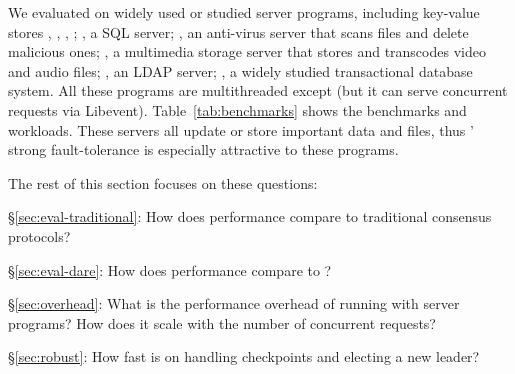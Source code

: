We evaluated \xxx on \nprog widely used or studied server programs, including
\nkvprog key-value stores \redis, \memcached, \ssdb, \mongodb; \mysql, a SQL
server; \clamav, an anti-virus server that scans files and delete malicious ones;
\mediatomb, a multimedia storage server that stores and transcodes video and
audio files; \openldap, an LDAP server; \calvin, a widely studied transactional
database system. All these programs are multithreaded except \redis (but it can 
serve concurrent requests via Libevent). Table~\ref{tab:benchmarks} shows the 
benchmarks and workloads. These servers all update or store 
important data and files, thus \paxos' strong fault-tolerance is especially 
attractive to these programs. 






The rest of this section focuses on these questions:

\begin{tightenum}

\item[\S\ref{sec:eval-traditional}:] How does \xxx performance compare
to traditional consensus protocols?

\item[\S\ref{sec:eval-dare}:] How does \xxx performance compare
to \dare?

\item[\S\ref{sec:overhead}:] What is the performance overhead of running \xxx
with server programs? How does it scale with the number of concurrent 
requests?


\item[\S\ref{sec:robust}:] How fast is \xxx on handling checkpoints and
electing a new leader?



\end{tightenum}





